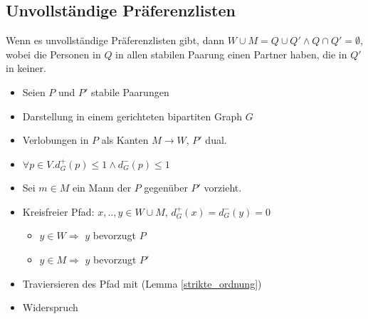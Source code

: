 \subsection{Unvollständige Präferenzlisten}
\begin{frame}
  \begin{Theorem}
  \label{partner_oder_nicht}
    Wenn es unvollständige Präferenzlisten gibt, dann $W \cup M = Q \cup Q' \land  Q \cap Q' = \emptyset$, wobei die Personen in $Q$ in allen stabilen Paarung einen Partner haben, die in $Q'$ in keiner.
  \end{Theorem}

  \begin{Beweis}
  \label{partner_oder_nicht_bew}
    \begin{itemize}[<+->]
      \item Seien $P$ und $P'$ stabile Paarungen
      \item Darstellung in einem gerichteten bipartiten Graph $G$
      \item Verlobungen in $P$ als Kanten $M \rightarrow W$, $P'$ dual.
      \item $\forall p \in V. d^{+}_{G}(p) \leq 1 \land d^{-}_{G}(p) \leq 1$
      \item Sei $m \in M$ ein Mann der $P$ gegenüber $P'$ vorzieht.
      \item Kreisfreier Pfad: $x,..,y \in W \cup M$, $d^{+}_{G}(x) = d^{-}_{G}(y) = 0$
      \begin{itemize}
        \item $y \in W \Longrightarrow$ $y$ bevorzugt $P$
        \item $y \in M \Longrightarrow$ $y$ bevorzugt $P'$
      \end{itemize}
      \item Traviersieren des Pfad mit (Lemma \ref{strikte_ordnung})
      \item Widerspruch
    \end{itemize}
  \end{Beweis}
\end{frame}

